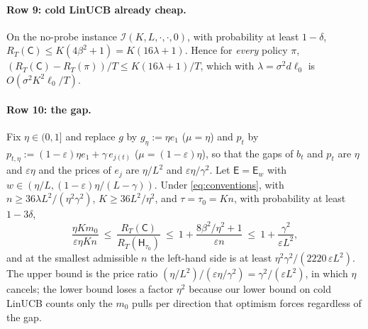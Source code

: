\documentclass[anon]{alt2027} %
\newcommand{\eps}{\varepsilon}
\newcommand{\Cold}{\mathsf{C}}
\newcommand{\Exp}{\mathsf{E}}
\newcommand{\Hyb}{\mathsf{H}}
\begin{document}
\paragraph{Row 9: cold LinUCB already cheap.}
\begin{proposition}
\label{prop:cat-cheap}
On the no-probe instance $\mathcal I(K,L,\cdot,\cdot,0)$, with probability
at least $1-\delta$, $R_T(\Cold)\le K(4\beta^2+1)=K(16\lambda+1)$. Hence for
\emph{every} policy $\pi$, $(R_T(\Cold)-R_T(\pi))/T\le K(16\lambda+1)/T$, which with
$\lambda=\sigma^2d\ell_0$ is $O(\sigma^2K^2\ell_0/T)$.
\end{proposition}

\paragraph{Row 10: the gap.}
\begin{proposition}
\label{prop:cat-gap}
Fix $\eta\in(0,1]$ and replace $g$ by $g_\eta:=\eta e_1$ ($\mu=\eta$) and
$p_t$ by $p_{t,\eta}:=(1-\eps)\eta e_1+\gamma\,e_{j(t)}$ ($\mu=(1-\eps)\eta$), so that
the gaps of $b_t$ and $p_t$ are $\eta$ and $\eps\eta$ and the prices of
$e_j$ are $\eta/L^2$ and $\eps\eta/\gamma^2$. Let $\Exp=\Exp_w$ with
$w\in(\eta/L,(1-\eps)\eta/(L-\gamma))$. Under \eqref{eq:conventions}, with
$n\ge36\lambda L^2/(\eta^2\gamma^2)$, $K\ge36L^2/\eta^2$, and $\tau=\tau_0=Kn$, with
probability at least $1-3\delta$,
\[
\frac{\eta Km_0}{\eps\eta Kn}\ \le\
\frac{R_T(\Cold)}{R_T(\Hyb_{\tau_0})}\ \le\ 1+\frac{8\beta^2/\eta^2+1}{\eps n}\ \le\ 1+\frac{\gamma^2}{\eps L^2},
\]
and at the smallest admissible $n$ the left-hand side is at least
$\eta^2\gamma^2/(2220\,\eps L^2)$.
The upper bound is the price ratio $(\eta/L^2)/(\eps\eta/\gamma^2)=\gamma^2/(\eps L^2)$,
in which $\eta$ cancels; the lower bound loses a factor $\eta^2$ because our
lower bound on cold LinUCB counts only the $m_0$ pulls per direction that
optimism forces regardless of the gap.
\end{proposition}
\end{document}
